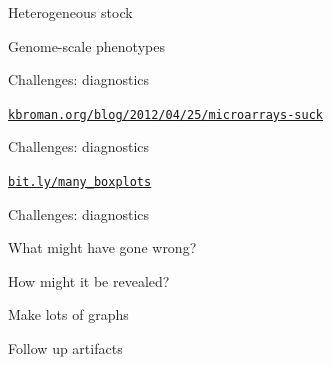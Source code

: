 \documentclass[12pt,t]{beamer}
\begin{document}
\begin{frame}[c]{Heterogeneous stock}

  \vspace{2mm}


\end{frame}


\begin{frame}[c]{Genome-scale phenotypes}


\end{frame}



\begin{frame}{Challenges: {\color{foreground} diagnostics}}

\vspace{2mm}


\vspace{3mm}

\hfill \href{http://kbroman.org/blog/2012/04/25/microarrays-suck}{\scriptsize \lolit \tt kbroman.org/blog/2012/04/25/microarrays-suck}

\end{frame}


\begin{frame}{Challenges: {\color{foreground} diagnostics}}

  \vspace{8mm}


\vspace{3mm}

\hfill
\href{https://bit.ly/many_boxplots}{\scriptsize
  \lolit \tt bit.ly/many\_boxplots}

\end{frame}


\begin{frame}[c]{Challenges: {\color{foreground} diagnostics}}

\vspace{-20mm}

  \bbi
\item What might have gone wrong?
\item How might it be revealed?
\item Make lots of graphs
\item Follow up artifacts
  \ei

\end{frame}
\end{document}
